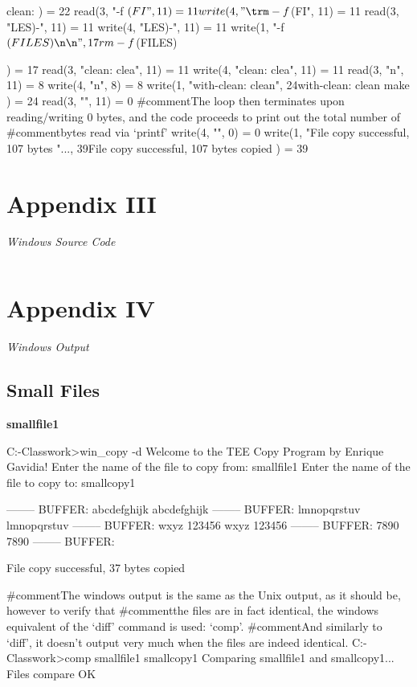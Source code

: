 \documentclass[12pt]{article}
\newcommand {\filename}[1] {\flushleft \textbf{#1}}
\newcommand {\append}[2] {\section*{Appendix #1} \textsl{\large #2}}
\newcommand {\includesource}[2] {\inputminted[linenos, fontsize=\scriptsize, frame=lines]{#1}{#2}}
\begin{document}
\begin{shelloutput}
clean:
) = 22
read(3, "\trm -f $(FI", 11)             = 11
write(4, "\trm -f $(FI", 11)            = 11
read(3, "LES)\n\nwith-", 11)            = 11
write(4, "LES)\n\nwith-", 11)           = 11
write(1, "\trm -f $(FILES)\n\n", 17	rm -f $(FILES)

)    = 17
read(3, "clean: clea", 11)              = 11
write(4, "clean: clea", 11)             = 11
read(3, "n\n\tmake\n", 11)              = 8
write(4, "n\n\tmake\n", 8)              = 8
write(1, "with-clean: clean\n\tmake\n", 24with-clean: clean
	make
) = 24
read(3, "", 11)                         = 0
#comment{The loop then terminates upon reading/writing 0 bytes, and the code proceeds to print out the total number of}
#comment{bytes read via `printf'}
write(4, "", 0)                         = 0
write(1, "File copy successful, 107 bytes "..., 39File copy successful, 107 bytes copied
) = 39
\end{shelloutput}


\append{III} {Windows Source Code}
\includesource{c}{win_copy.c}


\append{IV} {Windows Output}
\subsection*{Small Files}

\filename{smallfile1}
\begin{shelloutput}
C:\Users\Enrique\School\OS-Classwork>win_copy -d
Welcome to the TEE Copy Program by Enrique Gavidia!
Enter the name of the file to copy from:
smallfile1
Enter the name of the file to copy to:
smallcopy1

--------
BUFFER: abcdefghijk
abcdefghijk
--------
BUFFER: lmnopqrstuv
lmnopqrstuv
--------
BUFFER: wxyz
123456
wxyz
123456
--------
BUFFER: 7890
7890
--------
BUFFER:

File copy successful, 37 bytes copied

#comment{The windows output is the same as the Unix output, as it should be, however to verify that}
#comment{the files are in fact identical, the windows equivalent of the `diff' command is used: `comp'.}
#comment{And similarly to `diff', it doesn't output very much when the files are indeed identical.}
C:\Users\Enrique\School\OS-Classwork>comp smallfile1 smallcopy1
Comparing smallfile1 and smallcopy1...
Files compare OK

\end{shelloutput}
\end{document}
